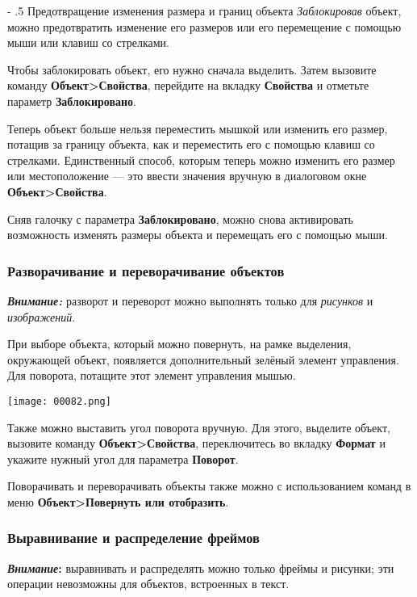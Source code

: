 \documentclass[a4paper,10pt]{article}
\makeatletter
\renewcommand\paragraph{%
   \@startsection{paragraph}{4}{0mm}%
      {-\baselineskip}%
      {.5\baselineskip}%
      {\normalfont\normalsize\bfseries}}
\makeatother
\begin{document}
\paragraph{Предотвращение изменения размера и границ объекта}
\textit{Заблокировав} объект, можно предотвратить изменение его размеров или его перемещение с помощью мыши или клавиш со стрелками.

Чтобы заблокировать объект, его нужно сначала выделить. Затем вызовите команду \textbf{Объект>Свойства}, перейдите на вкладку \textbf{Свойства} и отметьте параметр \textbf{Заблокировано}.

Теперь объект больше нельзя переместить мышкой или изменить его размер, потащив за границу объекта, как и переместить его с помощью клавиш со стрелками. Единственный способ, которым теперь можно изменить его размер или местоположение --- это ввести значения вручную в диалоговом окне \textbf{Объект>Свойства}.

Сняв галочку с параметра \textbf{Заблокировано}, можно снова активировать возможность изменять размеры объекта и перемещать его с помощью мыши.

\subsubsection{Разворачивание и переворачивание объектов}
\begin{mdframed}[backgroundcolor=blue!10]
\textbf{\textit{Внимание:}} разворот и переворот можно выполнять только для \textit{рисунков} и \textit{изображений}.
\end{mdframed}

При выборе объекта, который можно повернуть, на рамке выделения, окружающей объект, появляется дополнительный зелёный элемент управления. Для поворота, потащите этот элемент управления мышью.

\texttt{[image: 00082.png]}

Также можно выставить угол поворота вручную. Для этого, выделите объект, вызовите команду \textbf{Объект>Свойства}, переключитесь во вкладку \textbf{Формат} и укажите нужный угол для параметра \textbf{Поворот}.

Поворачивать и переворачивать объекты также можно с использованием команд в меню \textbf{Объект>Повернуть или отобразить}.

\subsubsection{Выравнивание и распределение фреймов}
\begin{mdframed}[backgroundcolor=blue!10]
\textbf{\textit{Внимание}:} выравнивать и распределять можно только фреймы и рисунки; эти операции невозможны для объектов, встроенных в текст.
\end{mdframed}
\end{document}
